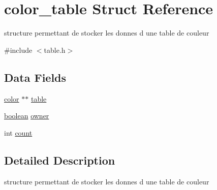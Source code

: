 \hypertarget{structcolor__table}{\section{color\-\_\-table Struct Reference}
\label{structcolor__table}
}


structure permettant de stocker les donnes d une table de couleur  




{\ttfamily \#include $<$table.\-h$>$}

\subsection*{Data Fields}
\begin{DoxyCompactItemize}
\item 
\hyperlink{table_8h_a37dbdc30935031c05304482e1be89d8f}{color} $\ast$$\ast$ \hyperlink{structcolor__table_afc215ebb482518a202f1703594fd51a0}{table}
\item 
\hyperlink{table_8h_a7c6368b321bd9acd0149b030bb8275ed}{boolean} \hyperlink{structcolor__table_a4641ea1034fd962e8e0ef9cf6b3aefdc}{owner}
\item 
int \hyperlink{structcolor__table_ad43c3812e6d13e0518d9f8b8f463ffcf}{count}
\end{DoxyCompactItemize}


\subsection{Detailed Description}
structure permettant de stocker les donnes d une table de couleur 

